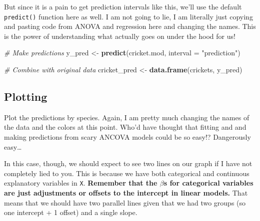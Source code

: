 \documentclass[
]{book}
\newenvironment{Shaded}{\begin{snugshade}}{\end{snugshade}}
\newcommand{\CommentTok}[1]{\textcolor[rgb]{0.56,0.35,0.01}{\textit{#1}}}
\newcommand{\DataTypeTok}[1]{\textcolor[rgb]{0.13,0.29,0.53}{#1}}
\newcommand{\KeywordTok}[1]{\textcolor[rgb]{0.13,0.29,0.53}{\textbf{#1}}}
\newcommand{\NormalTok}[1]{#1}
\newcommand{\OperatorTok}[1]{\textcolor[rgb]{0.81,0.36,0.00}{\textbf{#1}}}
\newcommand{\StringTok}[1]{\textcolor[rgb]{0.31,0.60,0.02}{#1}}
\begin{document}
\begin{Shaded}
\end{Shaded}

But since it is a pain to get prediction intervals like this, we'll use the default \texttt{predict()} function here as well. I am not going to lie, I am literally just copying and pasting code from ANOVA and regression here and changing the names. This is the power of understanding what actually goes on under the hood for us!

\begin{Shaded}
\begin{Highlighting}[]
\CommentTok{# Make predictions}
\NormalTok{y_pred <-}\StringTok{ }\KeywordTok{predict}\NormalTok{(cricket.mod, }\DataTypeTok{interval =} \StringTok{"prediction"}\NormalTok{)}

\CommentTok{# Combine with original data}
\NormalTok{cricket_pred <-}\StringTok{ }\KeywordTok{data.frame}\NormalTok{(crickets, y_pred)}
\end{Highlighting}
\end{Shaded}

\hypertarget{plotting-2}{%
\subsection{Plotting}\label{plotting-2}}

Plot the predictions by species. Again, I am pretty much changing the names of the data and the colors at this point. Who'd have thought that fitting and and making predictions from scary ANCOVA models could be so easy!? Dangerously easy\ldots{}

In this case, though, we should expect to see two lines on our graph if I have not completely lied to you. This is because we have both categorical and continuous explanatory variables in \texttt{X}. \textbf{Remember that the \(\beta\)s for categorical variables are just adjustments or offsets to the intercept in linear models.} That means that we should have two parallel lines given that we had two groups (so one intercept + 1 offset) and a single slope.
\end{document}
